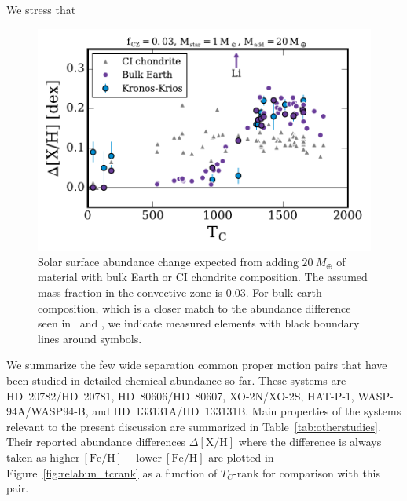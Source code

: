 \documentclass[manuscript]{aastex6}
\newcommand{\figname}{Figure}
\newcommand*\elem[1]{\ensuremath{\mathrm{#1}}}
\newcommand*\elemH[1]{\ensuremath{[\mathrm{#1}/\elem{H}]}}
\newcommand*{\feh}{\ensuremath{\elemH{Fe}}}
\newcommand{\sunanalog}{\text{Krios}}
\newcommand{\bizarreone}{\text{Kronos}}
\newcommand{\Tcondens}{\ensuremath{T_C}}
\newcommand{\mearth}{\ensuremath{M_\oplus}}
\renewcommand\tablename{Table}
\begin{document}
We stress that







\begin{figure}[htpb]
  \centering
  \includegraphics[width=0.8\linewidth]{toycalc.pdf}
  \caption{Solar surface abundance change expected from adding $20~\mearth$ of
    material with bulk Earth or CI chondrite composition.
    The assumed mass fraction in the convective zone is $0.03$.
    For bulk earth composition, which is a closer match to the abundance difference
    seen in \bizarreone\ and \sunanalog, we indicate measured elements with black boundary
    lines around symbols.
  }
  \label{fig:toycalc}
\end{figure}






We summarize the few wide separation common proper motion pairs that have been
studied in detailed chemical abundance so far.
These systems are HD~20782/HD~20781, HD~80606/HD~80607, XO-2N/XO-2S, HAT-P-1,
WASP-94A/WASP94-B, and HD~133131A/HD~133131B.
Main properties of the systems relevant to the present discussion are
summarized in \tablename~\ref{tab:otherstudies}.
Their reported abundance differences $\Delta\elemH{X}$ where the difference is
always taken as $\mathrm{higher}~\feh - \mathrm{lower}~\feh$ are plotted in
\figname~\ref{fig:relabun_tcrank} as a function of \Tcondens-rank for
comparison with this pair.
\end{document}
